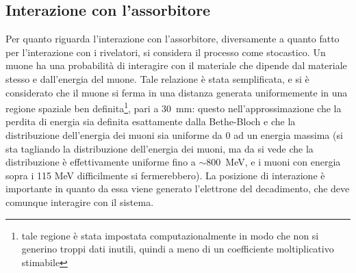 \subsection{Interazione con l'assorbitore}
Per quanto riguarda l'interazione con l'assorbitore, diversamente a quanto fatto per l'interazione con i rivelatori, si considera il processo come stocastico. Un muone
ha una probabilità di interagire con il materiale che dipende dal materiale stesso e dall'energia del muone. Tale relazione è stata semplificata, e si è considerato che il
muone si ferma in una distanza generata uniformemente in una regione spaziale ben definita\footnote{tale regione è stata impostata computazionalmente in modo che non si generino troppi
dati inutili, quindi a meno di un coefficiente moltiplicativo stimabile}, pari a 30~mm: questo nell'approssimazione che la perdita di energia sia definita esattamente dalla Bethe-Bloch e che la distribuzione dell'energia dei muoni sia uniforme da 0 ad un energia massima (si sta tagliando la distribuzione dell'energia dei muoni, ma da \cite{bib:Patrignani:2016xqp} si vede che la distribuzione \`e effettivamente uniforme fino a $\sim $800~MeV, e i muoni con energia sopra i 115 MeV difficilmente si fermerebbero). La posizione di interazione \`e importante in quanto da essa viene generato l'elettrone del decadimento, che deve comunque interagire con il sistema.

